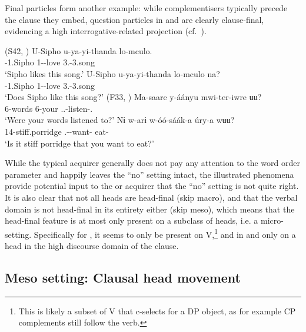 \documentclass[output=paper]{langsci/langscibook}
\begin{document}
Final particles form another example: while complementisers typically precede
the clause they embed, question particles in  and  are clearly
clause-final, evidencing a high interrogative-related projection (cf.\
\citealt{Buell2005,Buell2011}).\largerpage[-2]

\ea\label{ex:vdwal:3.8} (S42, \citealt[69]{Buell2005})
	\ea
	\gll	U-Sipho  u-ya-yi-thanda  lo-mculo.\\
            \Aug-1.Sipho  1\Sm-\Om{}-love  3.\Dem{}-3.song\\
	\glt    ‘Sipho likes this song.’
	\ex
	\gll	 U-Sipho  u-ya-yi-thanda  lo-mculo  na?\\
            \Aug-1.Sipho  1\Sm-\Om{}-love  3.\Dem{}-3.song  \glossQ{}\\
	\glt    ‘Does Sipho like this song?’
    \z\pagebreak
\ex {} (F33, \citealt[51]{Gibson2012})
    \ea
	\gll	 Ma-saare  y-áányu  mwi-ter-iwre  ʉʉ?\\
            6-words  6-your  \Spl.\Sm{}.\Pst{}-listen-\Pfv.\Pass{}  \glossQ{}\\
	\glt    ‘Were your words listened to?’
	\ex
	\gll	 Nɨ  w-arɨ  w-óó-sáák-a  úry-a  wʉʉ?\\
            \Cop{}  14-stiff.porridge  \Ssg.\Sm-\Prog{}-want-\Fv{}  eat-\Fv{}  \glossQ{}\\
    \glt    ‘Is it stiff porridge that you want to eat?’
	\z
\z

While the typical  acquirer generally does not pay any attention to the
word order parameter and happily leaves the \enquote{no} setting intact, the
illustrated phenomena provide potential input to the \ili{Rangi} or  acquirer
that the \enquote{no} setting is not quite right. It is also clear that not all heads
are head-final (skip macro), and that the verbal domain is not head-final in
its entirety either (skip meso), which means that the head-final feature is at
most only present on a subclass of heads, i.e. a micro-setting. Specifically
for \ili{Tunen}, it seems to only be present on V,\footnote{This is likely a subset
of V that c-selects for a DP object, as for example CP complements still follow
the verb.} and in \ili{Rangi} and \ili{Zulu} only on a head in the high discourse domain of
the clause.

\subsection{Meso setting: Clausal head movement}\label{sub:3.2.2}
\end{document}
